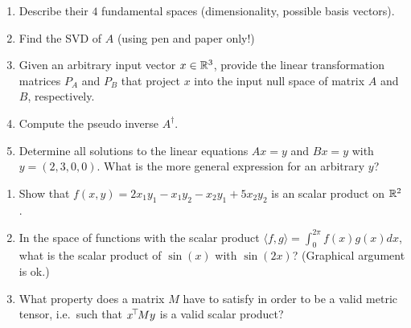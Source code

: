 \begin{enumerate}

  \item Describe their $4$ fundamental spaces (dimensionality, possible basis
    vectors).


  \item Find the SVD of $A$ (using pen and paper only!)


  \item Given an arbitrary input vector $x\in{\mathbb{R}}^3$, provide the linear
    transformation matrices $P_A$ and $P_B$ that project $x$ into the
    input null space of matrix $A$ and $B$, respectively.


  \item Compute the pseudo inverse $A^\dagger$.


  \item Determine all solutions to the linear equations $Ax = y$ and $Bx = y$
    with $y = (2, 3, 0, 0)$.  What is the more
    general expression for an arbitrary $y$?


\end{enumerate}





\begin{enumerate}

  \item Show that $f(x, y) = 2x_1 y_1 - x_1 y_2 - x_2 y_1 + 5x_2 y_2$ is an scalar
    product on ${\mathbb{R}}^2$.

  \item In the space of functions with the scalar product $\langle f, g\rangle
    = \int_0^{2\pi} f(x) g(x) dx$, what is the scalar product of $\sin(x)$
    with $\sin(2x)$?  (Graphical argument is ok.)


  \item What property does a matrix $M$ have to satisfy in order to be a valid
    metric tensor, i.e.\ such that $x^{\!\top\!} M y$ is a valid scalar product?

\end{enumerate}




\exerfoot
